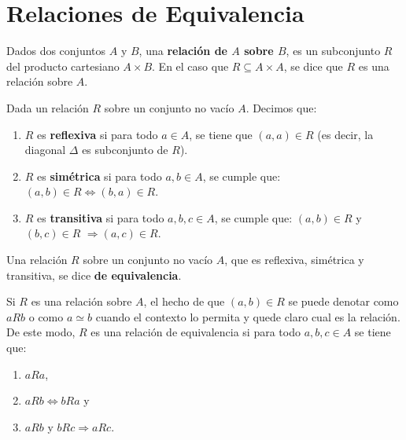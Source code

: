 \documentclass[12pt,]{krantz}
\theoremstyle{definition}
\theoremstyle{definition}
\theoremstyle{definition}
\theoremstyle{remark}
\let\BeginKnitrBlock\begin \let\EndKnitrBlock\end
\begin{document}
\section{Relaciones de Equivalencia}\label{relaciones-de-equivalencia}

\smallskip

\BeginKnitrBlock{definition}
\protect\hypertarget{def:unnamed-chunk-20}{}{\label{def:unnamed-chunk-20}
}Dados dos conjuntos \(A\) y \(B\), una \textbf{relación de \(A\) sobre
\(B\)}, es un subconjunto \(R\) del producto cartesiano \(A\times B\).
En el caso que \(R\subseteq A\times A\), se dice que \(R\) es una
relación sobre \(A\).
\EndKnitrBlock{definition}

\BeginKnitrBlock{definition}
\protect\hypertarget{def:unnamed-chunk-21}{}{\label{def:unnamed-chunk-21}
}Dada un relación \(R\) sobre un conjunto no vacío \(A\). Decimos que:

\begin{enumerate}
\def\labelenumi{\roman{enumi})}
\item
  \(R\) es \textbf{reflexiva} si para todo \(a\in A\), se tiene que
  \((a,a)\in R\) (es decir, la diagonal \(\Delta\) es subconjunto de
  \(R\)).
\item
  \(R\) es \textbf{simétrica} si para todo \(a,b \in A\), se cumple que:
  \((a,b)\in R \Leftrightarrow (b,a)\in R\).
\item
  \(R\) es \textbf{transitiva} si para todo \(a,b, c \in A\), se cumple
  que: \((a,b)\in R\) y \((b,c)\in R\) \(\Rightarrow (a,c)\in R\).
\end{enumerate}
\EndKnitrBlock{definition}

\BeginKnitrBlock{definition}
\protect\hypertarget{def:unnamed-chunk-22}{}{\label{def:unnamed-chunk-22}
}Una relación \(R\) sobre un conjunto no vacío \(A\), que es reflexiva,
simétrica y transitiva, se dice \textbf{de equivalencia}.
\EndKnitrBlock{definition}

\BeginKnitrBlock{remark}
{}Si \(R\) es una relación sobre \(A\), el hecho
de que \((a,b)\in R\) se puede denotar como \(aRb\) o como \(a\simeq b\)
cuando el contexto lo permita y quede claro cual es la relación. De este
modo, \(R\) es una relación de equivalencia si para todo \(a,b,c\in A\)
se tiene que:

\begin{enumerate}
\def\labelenumi{\roman{enumi})}
\item
  \(aRa\),
\item
  \(aRb\Leftrightarrow bRa\) y
\item
  \(aRb\) y \(bRc\Rightarrow aRc\).
\end{enumerate}
\EndKnitrBlock{remark}
\end{document}
